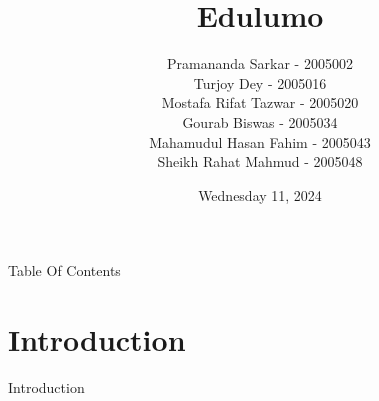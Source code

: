 \documentclass{beamer}
\title{Edulumo}
\author[Group Members]{
Pramananda Sarkar - 2005002 \\
Turjoy Dey - 2005016 \\
Mostafa Rifat Tazwar - 2005020 \\
Gourab Biswas - 2005034 \\
Mahamudul Hasan Fahim - 2005043 \\
Sheikh Rahat Mahmud - 2005048
}
\institute[VFU] %
{
 Department of Computer Science and Technology, BUET
}
\date{Wednesday 11, 2024}
\begin{document}
\begin{frame}
    \titlepage
\end{frame}

\begin{frame}{Table Of Contents}
    \tableofcontents
\end{frame}

\section{Introduction}
\begin{frame}{Introduction}
\end{frame}
\end{document}
